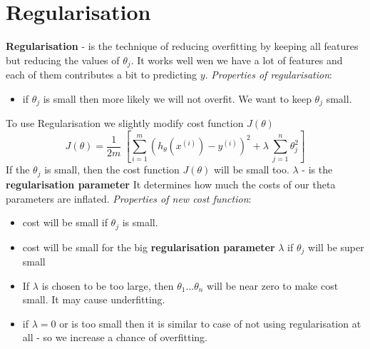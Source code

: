 \documentclass{article}
\begin{document}
\section{Regularisation}
\textbf{Regularisation} - is the technique of reducing overfitting by keeping all features but reducing the values of $\theta_j$.
\newline
It works well wen we have a lot of features and each of them contributes a bit to predicting $y$.
\newline 
\newline
\textit{Properties of regularisation}: 
\begin{itemize}
\item if $\theta_j$ is small then more likely we will not overfit. We want to keep $\theta_j$ small.
\end{itemize}
To use Regularisation we slightly modify cost function $J(\theta)$
\begin{equation}
J(\theta) = \dfrac{1}{2m}\ \left[ \sum_{i=1}^m (h_\theta(x^{(i)}) - y^{(i)})^2 + \lambda\ \sum_{j=1}^n \theta_j^2 \right]
\end{equation}
If the $\theta_j$ is small, then the cost function $J(\theta)$ will be small too. 
\newline
$\lambda$ - is the \textbf{regularisation parameter} It determines how much the costs of our theta parameters are inflated.
\newline
\newline
\textit{Properties of new cost function}: 
\begin{itemize}
\item cost will be small if $\theta_j$ is small.
\item cost will be small for the big \textbf{regularisation parameter} $\lambda$ if $\theta_j$ will be super small
\item If $\lambda$ is chosen to be too large, then $\theta_1...\theta_n$ will be near zero to make cost small. It may cause underfitting. 
\item if $\lambda=0$ or is too small then it is similar to case of not using regularisation at all - so we increase a chance of overfitting.
\end{itemize}
\end{document}

